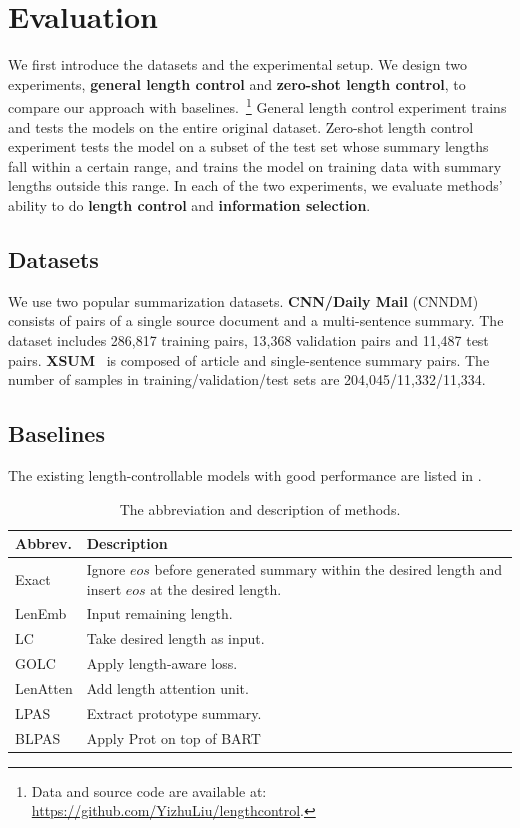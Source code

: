 \section{Evaluation}
\label{sec:eval}

We first introduce the datasets
and the experimental setup. 
We design two experiments, 
\textbf{general length control} and \textbf{zero-shot length control},
to compare our approach with baselines.~\footnote{Data and source code are 
available at: \url{https://github.com/YizhuLiu/lengthcontrol}.}
General length control experiment trains and tests the models on 
the entire original dataset.
Zero-shot length control experiment tests the model on 
a subset of the test set 
whose summary lengths fall within a certain range,
and trains the model on training data with summary lengths outside this range.
In each of the two experiments, we evaluate methods' ability to do
\textbf{length control} and 
\textbf{information selection}.

\subsection{Datasets}
We use two popular summarization datasets.
\textbf{CNN/Daily Mail}
(CNNDM)~\cite{HermannKGEKSB15}
consists of pairs of a single source document and a multi-sentence summary.
The dataset includes 286,817 training pairs,
13,368 validation pairs and 11,487 test pairs.
\textbf{XSUM}~\cite{XSUM} is composed of article and 
single-sentence summary pairs. 
The number of samples in training/validation/test sets 
are 204,045/11,332/11,334.

\subsection{Baselines}
The existing length-controllable models with good performance are 
listed in . 

\begin{table}[th]
	\scriptsize
	\centering
	\begin{tabular}{|m{1.0cm}<{\raggedleft}|p{5.6cm}|}
		\hline
		\textbf{Abbrev.} & \textbf{Description} \\ 
		\hline
		Exact & \tabincell{l}{Ignore $eos$ before generated summary within the desired \\ length and insert $eos$ at the desired length.} \\
		\hline 
		LenEmb & Input remaining length.~\cite{KikuchiNSTO16} \\
		\hline
		LC & Take desired length as input.~\cite{LiuLZ18}\\
		\hline
		GOLC & Apply length-aware loss.~\cite{GOLC19} \\
		\hline
		LenAtten &Add length attention unit.~\cite{lenatten21} \\
		\hline
		LPAS & Extract prototype summary.~\cite{Proto20}\\
		\hline
		BLPAS & Apply Prot on top of BART\\
		\hline
	\end{tabular}
	\caption{The abbreviation and description of methods.}
	\label{tab:baselines}
\end{table}

